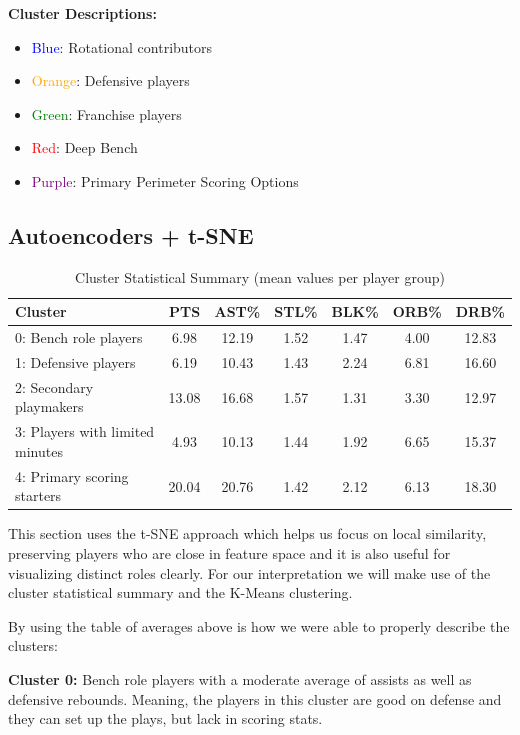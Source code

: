 \documentclass{article}
\begin{document}
{\bf Cluster Descriptions:}
\begin{itemize}
    \item \textcolor{blue}{Blue}: Rotational contributors
    \item \textcolor{orange}{Orange}: Defensive players
    \item \textcolor{green}{Green}: Franchise players
    \item \textcolor{red}{Red}: Deep Bench
    \item \textcolor{purple}{Purple}: Primary Perimeter Scoring Options
\end{itemize}

\subsection{Autoencoders + t-SNE}

\begin{table}[h!]
\centering
\caption{Cluster Statistical Summary (mean values per player group)}
\label{tab:cluster_stats}
\begin{tabular}{lcccccc}
\toprule
\textbf{Cluster} & \textbf{PTS} & \textbf{AST\%} & \textbf{STL\%} & \textbf{BLK\%} & \textbf{ORB\%} & \textbf{DRB\%} \\
\midrule
0: Bench role players & 6.98 & 12.19 & 1.52 & 1.47 & 4.00 & 12.83 \\
1: Defensive players & 6.19 & 10.43 & 1.43 & 2.24 & 6.81 & 16.60 \\
2: Secondary playmakers & 13.08 & 16.68 & 1.57 & 1.31 & 3.30 & 12.97 \\
3: Players with limited minutes & 4.93 & 10.13 & 1.44 & 1.92 & 6.65 & 15.37 \\
4: Primary scoring starters & 20.04 & 20.76 & 1.42 & 2.12 & 6.13 & 18.30 \\
\bottomrule
\end{tabular}
\end{table}

This section uses the t-SNE approach which helps us focus on local similarity, preserving players who are close in feature space and it is also useful for visualizing distinct roles clearly. For our interpretation we will make use of the cluster statistical summary and the K-Means clustering.

By using the table of averages above is how we were able to properly describe the clusters:

{\bf Cluster 0:} Bench role players with a moderate average of assists as well as defensive rebounds. Meaning, the players in this cluster are good on defense and they can set up the plays, but lack in scoring stats.
\end{document}
